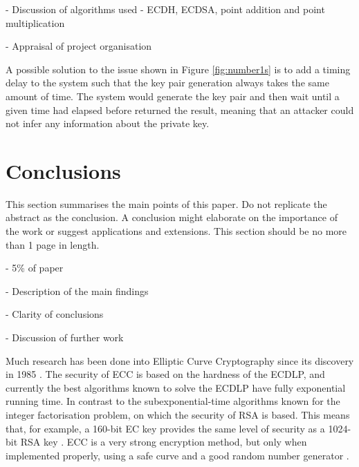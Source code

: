 \documentclass[12pt,a4paper]{article}
\begin{document}
- Discussion of algorithms used - ECDH, ECDSA, point addition and point multiplication

- Appraisal of project organisation

A possible solution to the issue shown in Figure \ref{fig:number1s} is to add a timing delay to the system such that the key pair generation always takes the same amount of time. 
The system would generate the key pair and then wait until a given time had elapsed before returned the result, 
meaning that an attacker could not infer any information about the private key. 


\section{Conclusions} \noindent
This section summarises the main points of this paper. 
Do not replicate the abstract as the conclusion. 
A conclusion might elaborate on the importance of the work or suggest applications and extensions. 
This section should be no more than 1 page in length. 

- 5\% of paper

- Description of the main findings

- Clarity of conclusions

- Discussion of further work

Much research has been done into Elliptic Curve Cryptography since its discovery in 1985 \cite{10.1007/3-540-39799-X_31,koblitz1987elliptic}. 
The security of ECC is based on the hardness of the ECDLP, 
and currently the best algorithms known to solve the ECDLP have fully exponential running time. 
In contrast to the subexponential-time algorithms known for the integer factorisation problem, 
on which the security of RSA is based. 
This means that, for example, a 160-bit EC key provides the same level of security as a 1024-bit RSA key \cite{hankerson2003guide,silverman2009arithmetic}. 
ECC is a very strong encryption method, but only when implemented properly, 
using a safe curve \cite{bernstein2013safecurves,10.1007/11745853_14}
and a good random number generator \cite{hotz2010console}. 



\end{document}
